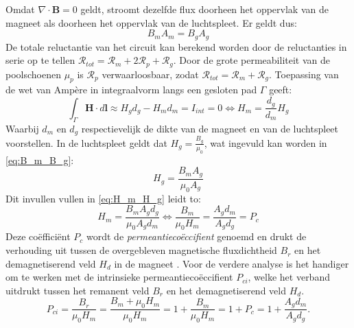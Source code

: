 \documentclass[we,twoside,openright,a4paper,11pt]{uantwerpenbamathesis}
\begin{document}
Omdat $\nabla \cdot \mathbf{B}=0$ geldt, stroomt dezelfde flux doorheen het oppervlak van de magneet als doorheen het oppervlak van de luchtspleet. Er geldt dus:
\begin{equation}\label{eq:B_m_B_g}
    B_m A_m = B_g A_g
\end{equation}
De totale reluctantie van het circuit kan berekend worden door de reluctanties in serie op te tellen $\mathcal{R}_{tot}=\mathcal{R}_{m}+2\mathcal{R}_{p}+\mathcal{R}_{g}$. Door de grote permeabiliteit van de poolschoenen $\mu_p$ is $\mathcal{R}_{p}$ verwaarloosbaar, zodat $\mathcal{R}_{tot}=\mathcal{R}_{m}+\mathcal{R}_{g}$. Toepassing van de wet van Ampère in integraalvorm langs een gesloten pad $\Gamma$ geeft:
\begin{equation}\label{eq:H_m_H_g}
    \int_\Gamma \mathbf{H}\cdot d\mathbf{l} \approx H_g d_g - H_m d_m = I_{int}=0 \Leftrightarrow H_m = \frac{d_g}{d_m}H_g
\end{equation}
Waarbij $d_m$ en $d_g$ respectievelijk de dikte van de magneet en van de luchtspleet voorstellen. In de luchtspleet geldt dat $H_g = \frac{B_g}{\mu_0}$, wat ingevuld kan worden in \ref{eq:B_m_B_g}:
\begin{equation}
    H_g = \frac{B_m A_g}{\mu_0 A_g}
\end{equation}
Dit invullen vullen in \ref{eq:H_m_H_g} leidt to:
\begin{equation}
    H_m = \frac{B_m A_g d_g}{\mu_0 A_g d_m} \Leftrightarrow \frac{B_m}{\mu_0 H_m} = \frac{A_g d_m}{A_g d_g} = P_c
\end{equation}
Deze coëfficiënt $P_c$ wordt de \textit{permeantiecoëccifient} genoemd en drukt de verhouding uit tussen de overgebleven magnetische fluxdichtheid $B_r$ en het demagnetiserend veld $H_d$ in de magneet \cite{mmpa_permanent_magnet_guidelines}. Voor de verdere analyse is het handiger om te werken met de intrinsieke permeantiecoëccifient $P_{ci}$, welke het verband uitdrukt tussen het remanent veld $B_r$ en het demagnetiserend veld $H_d$.
\begin{equation}
    P_{ci}=\frac{B_r}{\mu_0 H_m}=\frac{B_m+\mu_0 H_m}{\mu_0 H_m}=1+\frac{B_m}{\mu_0 H_m}=1+P_c = 1+\frac{A_g d_m}{A_g d_g}. 
\end{equation}
\end{document}
